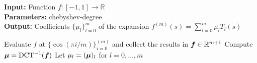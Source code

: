 \hspace*{\algorithmicindent} \textbf{Input:} Function $f:[-1, 1] \to \mathbb{R}$ \\%
\hspace*{\algorithmicindent} \textbf{Parameters:} \gls{chebyshev-degree} \\
\hspace*{\algorithmicindent} \textbf{Output:} Coefficients $\{ \mu_l \}_{l=0}^{m}$ of the expansion $f^{(m)}(s) = \sum_{l=0}^{m} \mu_l T_l(s)$
\begin{algorithmic}[1]
    \State Evaluate $f$ at $\{\cos(\pi i / m)\}_{i=0}^{(m)}$ and collect the results in $\boldsymbol{f}\in \mathbb{R}^{m+1}$
    \State Compute $\boldsymbol{\mu} = \operatorname{DCT}^{-1}(\boldsymbol{f})$
    \State Let $\mu_l = (\boldsymbol{\mu})_l$ for $l=0,\dots,m$
\end{algorithmic}
